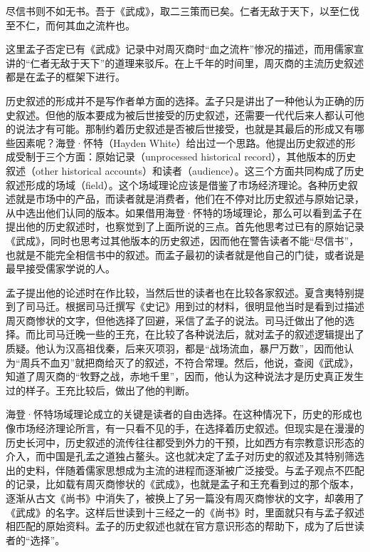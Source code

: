 
\begin{bookquote}尽信书则不如无书。吾于《武成》，取二三策而已矣。仁者无敌于天下，以至仁伐至不仁，而何其血之流杵也。\end{bookquote}


这里孟子否定已有《武成》记录中对周灭商时“血之流杵”惨况的描述，而用儒家宣讲的“仁者无敌于天下”的道理来驳斥。在上千年的时间里，周灭商的主流历史叙述都是在孟子的框架下进行。



历史叙述的形成并不是写作者单方面的选择。孟子只是讲出了一种他认为正确的历史叙述。但他的版本要成为被后世接受的历史叙述，还需要一代代后来人都认可他的说法才有可能。那制约着历史叙述是否被后世接受，也就是其最后的形成又有哪些因素呢？海登·怀特（Hayden White）给出过一个思路。他提出历史叙述的形成受制于三个方面：原始记录（unprocessed historical record），其他版本的历史叙述（other historical accounts）和读者（audience）。这三个方面共同构成了历史叙述形成的场域（field）。这个场域理论应该是借鉴了市场经济理论。各种历史叙述就是市场中的产品，而读者就是消费者，他们在不停对比历史叙述与原始记录，从中选出他们认同的版本。如果借用海登·怀特的场域理论，那么可以看到孟子在提出他的历史叙述时，也察觉到了上面所说的三点。首先他思考过已有的原始记录《武成》，同时也思考过其他版本的历史叙述，因而他在警告读者不能“尽信书”，也就是不能完全相信书中的叙述。而孟子最初的读者就是他自己的门徒，或者说是最早接受儒家学说的人。



孟子提出他的论述时在作比较，当然后世的读者也在比较各家叙述。夏含夷特别提到了司马迁。根据司马迁撰写《史记》用到过的材料，很明显他当时是看到过描述周灭商惨状的文字，但他选择了回避，采信了孟子的说法。司马迁做出了他的选择。而比司马迁晚一些的王充，在比较了各种说法后，就对孟子的叙述逻辑提出了质疑。他认为汉高祖伐秦，后来灭项羽，都是“战场流血，暴尸万数”，因而他认为“周兵不血刃”就把商给灭了的叙述，不符合常理。然后，他说，查阅《武成》，知道了周灭商的“牧野之战，赤地千里”，因而，他认为这种说法才是历史真正发生过的样子。王充比较后，做出了他的判断。



海登·怀特场域理论成立的关键是读者的自由选择。在这种情况下，历史的形成也像市场经济理论所言，有一只看不见的手，在选择着历史叙述。但现实是在漫漫的历史长河中，历史叙述的流传往往都受到外力的干预，比如西方有宗教意识形态的介入，而中国是孔孟之道独占鳌头。这也就决定了孟子对历史的叙述及其特别筛选出的史料，伴随着儒家思想成为主流的进程而逐渐被广泛接受。与孟子观点不匹配的记录，比如载有周灭商惨状的《武成》，也就是孟子和王充看到过的那个版本，逐渐从古文《尚书》中消失了，被换上了另一篇没有周灭商惨状的文字，却袭用了《武成》的名字。这样后世读到十三经之一的《尚书》时，里面就只有与孟子叙述相匹配的原始资料。孟子的历史叙述也就在官方意识形态的帮助下，成为了后世读者的“选择”。


